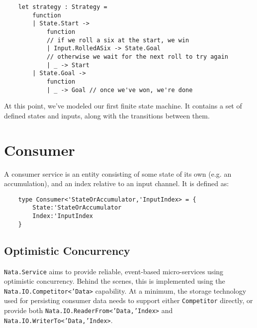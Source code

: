 \documentclass{article}
\begin{document}
\begin{verbatim}
    let strategy : Strategy =
        function
        | State.Start ->
            function
            // if we roll a six at the start, we win
            | Input.RolledASix -> State.Goal 
            // otherwise we wait for the next roll to try again
            | _ -> Start
        | State.Goal ->
            function
            | _ -> Goal // once we've won, we're done
\end{verbatim}

At this point, we've modeled our first finite state machine.  It contains a set of defined states and inputs, along with the transitions between them.



\clearpage
\section{Consumer}

A consumer service is an entity consisting of some state of its own (e.g. an accumulation), and an index relative to an input channel.  It is defined as:

\begin{verbatim}
    type Consumer<'StateOrAccumulator,'InputIndex> = {
        State:'StateOrAccumulator
        Index:'InputIndex
    }
\end{verbatim}

\subsection{Optimistic Concurrency}

\texttt{Nata.Service} aims to provide reliable, event-based micro-services using optimistic concurrency.  Behind the scenes, this is implemented using the \texttt{Nata.IO.Competitor<'Data>} capability.  At a minimum, the storage technology used for persisting consumer data needs to support either \texttt{Competitor} directly, or provide both \texttt{Nata.IO.ReaderFrom<'Data,'Index>} and \texttt{Nata.IO.WriterTo<'Data,'Index>}.
\end{document}
